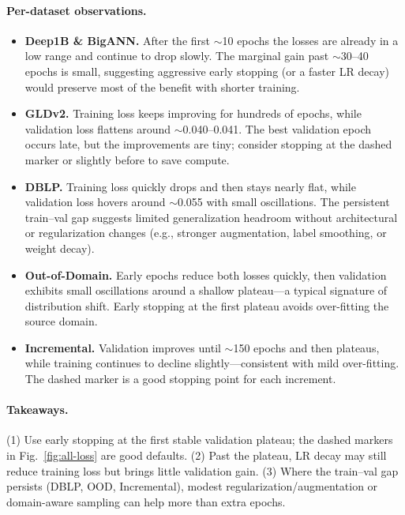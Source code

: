 \documentclass[sigconf,anonymous]{acmart}
\begin{document}
\paragraph{Per-dataset observations.}
\begin{itemize}
  \item \textbf{Deep1B \& BigANN.} After the first \(\sim\)10 epochs the losses
  are already in a low range and continue to drop slowly. The marginal gain past
  \(\sim\)30–40 epochs is small, suggesting aggressive early stopping (or a
  faster LR decay) would preserve most of the benefit with shorter training.
  \item \textbf{GLDv2.} Training loss keeps improving for hundreds of epochs,
  while validation loss flattens around \(\sim\)0.040–0.041. The best
  validation epoch occurs late, but the improvements are tiny; consider stopping
  at the dashed marker or slightly before to save compute.
  \item \textbf{DBLP.} Training loss quickly drops and then stays nearly flat,
  while validation loss hovers around \(\sim\)0.055 with small oscillations. The
  persistent train–val gap suggests limited generalization headroom without
  architectural or regularization changes (e.g., stronger augmentation, label
  smoothing, or weight decay).
  \item \textbf{Out-of-Domain.} Early epochs reduce both losses quickly, then
  validation exhibits small oscillations around a shallow plateau—a typical
  signature of distribution shift. Early stopping at the first plateau avoids
  over-fitting the source domain.
  \item \textbf{Incremental.} Validation improves until \(\sim\)150 epochs and
  then plateaus, while training continues to decline slightly—consistent with
  mild over-fitting. The dashed marker is a good stopping point for each
  increment.
\end{itemize}

\paragraph{Takeaways.}
(1) Use early stopping at the first stable validation plateau; the dashed
markers in Fig.~\ref{fig:all-loss} are good defaults.  
(2) Past the plateau, LR decay may still reduce training loss but brings little
validation gain.  
(3) Where the train–val gap persists (DBLP, OOD, Incremental), modest
regularization/augmentation or domain-aware sampling can help more than extra
epochs.
\end{document}
